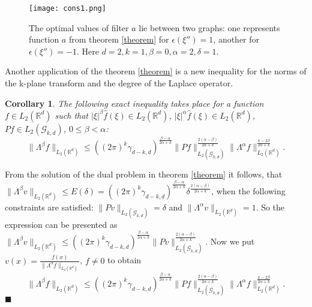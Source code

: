 \documentclass[12pt]{iopart}
\newtheorem{corollary}{Corollary}
\newenvironment{proof}
{\par\noindent{\bf Proof}}
{\hfill$\scriptstyle\blacksquare$}
\begin{document}
	\begin{figure}[h]
		\centering
		\texttt{[image: cons1.png]}
		\caption{The optimal values of filter $a$ lie between two graphs: one represents function $a$ from theorem \ref{theorem} for $\epsilon(\xi'')=1$, another for $\epsilon(\xi'')=-1$. Here $d=2, k=1, \beta=0, \alpha=2, \delta=1$.}
		\label{pic1}
	\end{figure}
	Another application of the theorem \ref{theorem} is a new inequality for the norms of the k-plane transform and the degree of the Laplace operator.
	
	\begin{corollary}
		\label{cor2}
		The following exact inequality takes place for a function $f\in L_2(\mathbb R^d)$ such that $|\xi|^\beta\widehat f(\xi)\in L_2(\mathbb R^d)$, $|\xi|^\alpha\widehat f(\xi)\in L_2(\mathbb R^d)$, $Pf\in L_2(\mathcal G_{k,d})$, $0\leqslant\beta<\alpha$:
		\[
		\|\Lambda^\beta f\|_{L_2(\mathbb R^d)}\leqslant
		((2\pi)^k\gamma_{d-k,d})^{\frac{\beta-\alpha}{2\alpha+k}}\|Pf\|_{L_2(\mathcal G_{k,d})}^{\frac{2(\alpha-\beta)}{2\alpha+k}}\|\Lambda^\alpha f\|_{L_2(\mathbb
			R^d)}^\frac{k-2\beta}{2\alpha+k}.
		\]
	\end{corollary}
	
	\begin{proof}
		From the solution of the dual problem in theorem \ref{theorem} it follows, that \linebreak
		$\|\Lambda^\beta v\|_{L_2(\mathbb R^d)}\leqslant E(\delta)=
		((2\pi)^k\gamma_{d-k,d})^{\frac{\beta-\alpha}{2\alpha+k}}\delta^{\frac{2(\alpha-\beta)}{2\alpha+k}}$, 
		when the following constraints are satisfied: $\|Pv\|_{L_2(\mathcal G_{k,d})}=\delta$ and
		$\|\Lambda^\alpha v\|_{L_2(\mathbb R^d)}=1$. So the expression can be presented as \linebreak
		$\|\Lambda^\beta v\|_{L_2(\mathbb R^d)}\leqslant
		((2\pi)^k\gamma_{d-k,d})^{\frac{\beta-\alpha}{2\alpha+k}}\|Pv\|_{L_2(\mathcal G_{k,d})}^{\frac{2(\alpha-\beta)}{2\alpha+k}}$.
		Now we put
		$v(x)=\frac{f(x)}{\|\Lambda^\alpha f\|_{L_2(\mathbb R^d)}}$, $f\ne 0$ to obtain
		\[
		\|\Lambda^\beta f\|_{L_2(\mathbb R^d)}\leqslant
		((2\pi)^k\gamma_{d-k,d})^{\frac{\beta-\alpha}{2\alpha+k}}\|Pf\|_{L_2(\mathcal G_{k,d})}^{\frac{2(\alpha-\beta)}{2\alpha+k}}\|\Lambda^\alpha f\|_{L_2(\mathbb
			R^d)}^\frac{k-2\beta}{2\alpha+k}.
		\]
	\end{proof}
	
\end{document}
